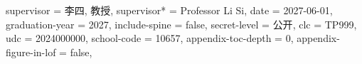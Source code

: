 {  %
  supervisor  = {李四, 教授},
  supervisor* = {Professor Li Si},
  date            = {2027-06-01},
  graduation-year = {2027},
  include-spine = false,
  secret-level = {公开},
  clc                = {TP999},
  udc                = {2024000000},
  school-code        = {10657},
  appendix-toc-depth = 0,
  appendix-figure-in-lof = false,
}











\usepackage{threeparttable}

\usepackage{multirow}

\usepackage{tabularx}

\usepackage{longtable}

\usepackage{algorithm}
\usepackage{algorithmic}

\usepackage{siunitx}



